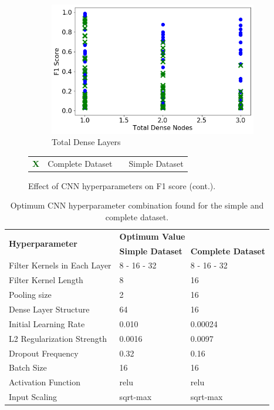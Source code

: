 \begin{figure}
    \begin{subfigure}[t]{0.49\textwidth}
        \centering
        \includegraphics[width=\textwidth]{images/cnn_dense_layers_total.png}
        \caption{Total Dense Layers}
        \label{fig:cnn_dense_layers_total}
    \end{subfigure}
		\begin{tabular}{r@{ : }l r@{ : }l}
			\textcolor{darkgreen}{\textbf{\large{X}}} & Complete Dataset & \bluecircle & Simple Dataset \\
		\end{tabular}
        \caption{Effect of CNN hyperparameters on F1 score (cont.).}
        \label{fig:cnn_hyperparameters_f1_score}
\end{figure}

\begin{table}[H]
\centering
\caption{Optimum CNN hyperparameter combination found for the simple and complete dataset.}
\label{table:hyperparameter_opt_parameters_CNN}
\begin{tabular}{lll}
\hline
\multirow{2}{*}{\textbf{Hyperparameter}} & \multicolumn{2}{l}{\textbf{Optimum Value}} \\
 & \textbf{Simple Dataset} & \textbf{Complete Dataset} \\ \hline
Filter Kernels in Each Layer & 8 - 16 - 32 & 8 - 16 - 32 \\
Filter Kernel Length & 8 & 16 \\
Pooling size & 2 & 16 \\
Dense Layer Structure & 64 & 16 \\
Initial Learning Rate & 0.010 & 0.00024 \\
L2 Regularization Strength & 0.0016 & 0.0097 \\
Dropout Frequency & 0.32 & 0.16 \\
Batch Size & 16 & 16 \\
Activation Function & relu & relu \\
Input Scaling & sqrt-max & sqrt-max \\ \hline
\end{tabular}
\end{table}

